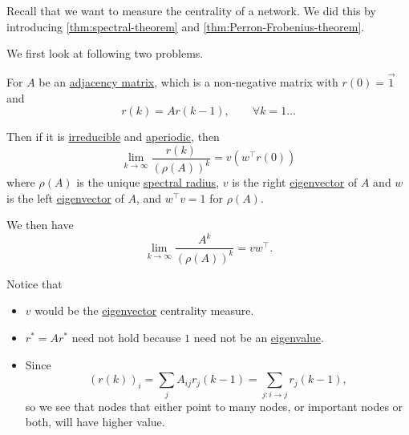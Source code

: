 Recall that we want to measure the centrality of a network. We did this by introducing \autoref{thm:spectral-theorem} and \autoref{thm:Perron-Frobenius-theorem}.

We first look at following two problems.
\begin{problem}
For \(A\) be an \hyperref[def:adjacency-matrix]{adjacency matrix}, which is a non-negative matrix with \(r(0) = \vec{1}\) and
\[
	r(k) = Ar(k - 1), \qquad \forall k = 1\dots
\]

Then if it is \hyperref[def:irreducible]{irreducible} and \hyperref[def:aperiodic]{aperiodic}, then
\[
	\lim_{k\to \infty } \frac{r(k)}{(\rho(A))^k} = v(w^{\top} r(0))
\]
where \(\rho(A)\) is the unique \hyperref[def:spectral-radius]{spectral radius}, \(v\) is the right \hyperref[def:eigenvector]{eigenvector} of \(A\) and \(w\) is the left \hyperref[def:eigenvector]{eigenvector} of \(A\), and \(w^{\top}v = 1\) for \(\rho(A)\).

We then have
\[
	\lim_{k\to \infty}\frac{A^k}{(\rho(A))^k} = vw^{\top}.
\]

\begin{remark}
	Notice that
	\begin{itemize}
		\item \(v\) would be the \hyperref[def:eigenvector]{eigenvector} centrality measure.
		\item \(r^{\ast} = A r^{\ast}\) need not hold because \(1\) need not be an \hyperref[def:eigenvalue]{eigenvalue}.
		\item Since
		      \[
			      (r(k))_i = \sum\limits_{j} A_{ij}r_{j}(k - 1) = \sum\limits_{j\colon i\to j} r_j(k-1),
		      \]
		      so we see that nodes that either point to many nodes, or important nodes or both, will have higher value.
	\end{itemize}
\end{remark}
\end{problem}

